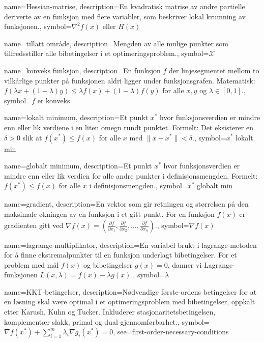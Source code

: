{
    name=Hessian-matrise,
    description={En kvadratisk matrise av andre partielle deriverte av en funksjon med flere variabler, som beskriver lokal krumning av funksjonen.},
    symbol={$\nabla^2 f(x)$ eller $H(x)$}
}

{
    name=tillatt område,
    description={Mengden av alle mulige punkter som tilfredsstiller alle bibetingelser i et optimeringsproblem.},
    symbol={$\mathcal{X}$}
}

{
    name=konveks funksjon,
    description={En funksjon $f$ der linjesegmentet mellom to vilkårlige punkter på funksjonen aldri ligger under funksjonsgrafen. Matematisk: $f(\lambda x + (1-\lambda)y) \leq \lambda f(x) + (1-\lambda)f(y)$ for alle $x, y$ og $\lambda \in [0,1]$.},
    symbol={$f$ er konveks}
}

{
    name=lokalt minimum,
    description={Et punkt $x^*$ hvor funksjonsverdien er mindre enn eller lik verdiene i en liten omegn rundt punktet. Formelt: Det eksisterer en $\delta > 0$ slik at $f(x^*) \leq f(x)$ for alle $x$ med $\|x - x^*\| < \delta$.},
    symbol={$x^*$ lokalt min}
}

{
    name=globalt minimum,
    description={Et punkt $x^*$ hvor funksjonsverdien er mindre enn eller lik verdien for alle andre punkter i definisjonsmengden. Formelt: $f(x^*) \leq f(x)$ for alle $x$ i definisjonsmengden.},
    symbol={$x^*$ globalt min}
}

{
    name=gradient,
    description={En vektor som gir retningen og størrelsen på den maksimale økningen av en funksjon i et gitt punkt. For en funksjon $f(x)$ er gradienten gitt ved $\nabla f(x) = (\frac{\partial f}{\partial x_1}, \frac{\partial f}{\partial x_2}, \ldots, \frac{\partial f}{\partial x_n})$.},
    symbol={$\nabla f(x)$}
}

{
    name=lagrange-multiplikator,
    description={En variabel brukt i lagrange-metoden for å finne ekstremalpunkter til en funksjon underlagt bibetingelser. For et problem med mål $f(x)$ og bibetingelser $g(x) = 0$, danner vi Lagrange-funksjonen $L(x, \lambda) = f(x) - \lambda g(x)$.},
    symbol={$\lambda$}
}

{
    name=KKT-betingelser,
    description={Nødvendige første-ordens betingelser for at en løsning skal være optimal i et optimeringsproblem med bibetingelser, oppkalt etter Karush, Kuhn og Tucker. Inkluderer stasjonaritetsbetingelsen, komplementær slakk, primal og dual gjennomførbarhet.},
    symbol={$\nabla f(x^*) + \sum_{i=1}^m \lambda_i \nabla g_i(x^*) = 0$},
    see={first-order-necessary-conditions}
}

